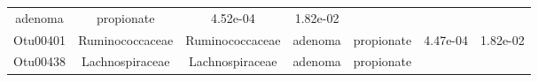 \documentclass[11pt,]{article}
\begin{document}
\begin{longtable}[]{@{}ccccccc@{}}
\begin{minipage}[t]{0.09\columnwidth}
adenoma\strut
\end{minipage} & \begin{minipage}[t]{0.11\columnwidth}\centering\strut
propionate\strut
\end{minipage} & \begin{minipage}[t]{0.09\columnwidth}\centering\strut
4.52e-04\strut
\end{minipage} & \begin{minipage}[t]{0.09\columnwidth}\centering\strut
1.82e-02\strut
\end{minipage}\tabularnewline
\begin{minipage}[t]{0.09\columnwidth}\centering\strut
Otu00401\strut
\end{minipage} & \begin{minipage}[t]{0.17\columnwidth}\centering\strut
Ruminococcaceae\strut
\end{minipage} & \begin{minipage}[t]{0.17\columnwidth}\centering\strut
Ruminococcaceae\strut
\end{minipage} & \begin{minipage}[t]{0.09\columnwidth}\centering\strut
adenoma\strut
\end{minipage} & \begin{minipage}[t]{0.11\columnwidth}\centering\strut
propionate\strut
\end{minipage} & \begin{minipage}[t]{0.09\columnwidth}\centering\strut
4.47e-04\strut
\end{minipage} & \begin{minipage}[t]{0.09\columnwidth}\centering\strut
1.82e-02\strut
\end{minipage}\tabularnewline
\begin{minipage}[t]{0.09\columnwidth}\centering\strut
Otu00438\strut
\end{minipage} & \begin{minipage}[t]{0.17\columnwidth}\centering\strut
Lachnospiraceae\strut
\end{minipage} & \begin{minipage}[t]{0.17\columnwidth}\centering\strut
Lachnospiraceae\strut
\end{minipage} & \begin{minipage}[t]{0.09\columnwidth}\centering\strut
adenoma\strut
\end{minipage} & \begin{minipage}[t]{0.11\columnwidth}\centering\strut
propionate\strut
\end{minipage} & \begin{minipage}[t]{0.09\columnwidth}\centering\strut

\end{minipage}
\end{longtable}
\end{document}
